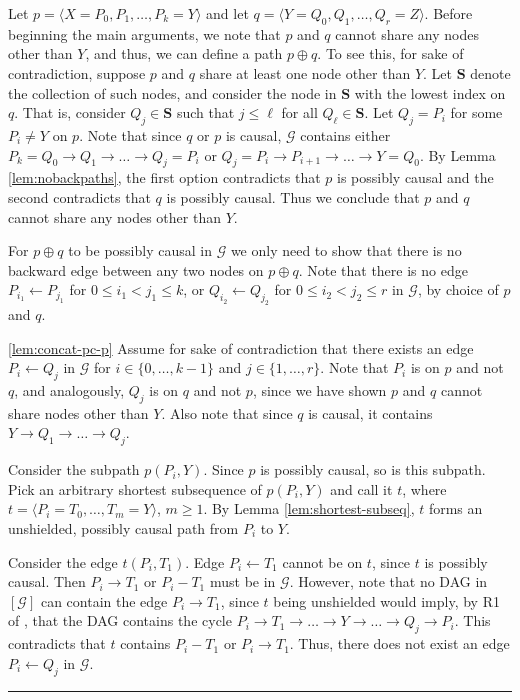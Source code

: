 \documentclass[twoside]{article}
\newcommand{\mb}[1]{\mathbf{#1}}
\newcommand{\g}[1][G]{\mathcal{#1}}
\newenvironment{proofof}[1][]{\begin{trivlist}
\item[\hskip \labelsep {\bfseries Proof of #1.}]}{\hfill\BlackBox\end{trivlist}}
\newcommand{\BlackBox}{\rule{1.5ex}{1.5ex}}
\begin{document}
\begin{proofof}[Lemma \ref{lem:concat}]
    Let $p= \langle X=P_0, P_1, \dots, P_k=Y \rangle$ and let $q= \langle Y=Q_0, Q_1, \dots, Q_r=Z \rangle$. Before beginning the main arguments, we note that $p$ and $q$ cannot share any nodes other than $Y$, and thus, we can define a path $p \oplus q$. To see this, for sake of contradiction, suppose $p$ and $q$ share at least one node other than $Y$. Let $\mb{S}$ denote the collection of such nodes, and consider the node in $\mb{S}$ with the lowest index on $q$. That is, consider $Q_j \in \mb{S}$ such that $j \le \ell$ for all $Q_{\ell} \in \mb{S}$. Let $Q_j=P_i$ for some $P_i \neq Y$ on $p$. Note that since $q$ or $p$ is causal, $\g$ contains either $P_k=Q_0 \to Q_1 \to \dots \to Q_j=P_i$ or $Q_j=P_i \to P_{i+1} \to \dots \to Y = Q_0$. By Lemma \ref{lem:nobackpaths}, the first option contradicts that $p$ is possibly causal and the second contradicts that $q$ is possibly causal. Thus we conclude that $p$ and $q$ cannot share any nodes other than $Y$.
    
    For $p \oplus q$ to be possibly causal in $\g$ we only need to show that there is no backward edge between any two nodes on $p \oplus q$. Note that there is no edge $P_{i_1} \gets P_{j_1}$ for $0 \le i_1 < j_1 \le k$, or $Q_{i_2} \gets Q_{j_2}$ for $0 \le i_2 < j_2 \le r$ in $\g$, by choice of $p$ and $q$. 
    
    \ref{lem:concat-pc-p}
    Assume for sake of contradiction that there exists an edge $P_i \gets Q_j$ in $\g$ for $i \in \{0, \dots, k-1\}$ and $j \in \{1, \dots, r\}$. Note that $P_i$ is on $p$ and not $q$, and analogously, $Q_j$ is on $q$ and not $p$, since we have shown $p$ and $q$ cannot share nodes other than $Y$. Also note that since $q$ is causal, it contains $Y \to Q_1 \to \dots \to Q_j$.
    
    Consider the subpath $p(P_i, Y)$. Since $p$ is possibly causal, so is this subpath. Pick an arbitrary shortest subsequence of $p( P_i, Y)$ and call it $t$, where $t=\langle P_i=T_0, \dots, T_m=Y \rangle$, $m \ge 1$. By Lemma \ref{lem:shortest-subseq}, $t$ forms an unshielded, possibly causal path from $P_i$ to $Y$.
    
    Consider the edge $t(P_i, T_1)$. Edge $P_i \gets T_1$ cannot be on $t$, since $t$ is possibly causal. Then $P_i \to T_1$ or $P_i - T_1$ must be in $\g$. However, note that no DAG in $[\g]$ can contain the edge $P_i \to T_1$, since $t$ being unshielded would imply, by R1 of \cite{meek1995causal}, that the DAG contains the cycle $P_i \to T_1 \to \dots \to Y \to \dots \to Q_j \to P_i$. This contradicts that $t$ contains $P_i - T_1$ or $P_i \to T_1$. Thus, there does not exist an edge $P_i \gets Q_j$ in $\g$. 
    

\end{proofof}
\end{document}
